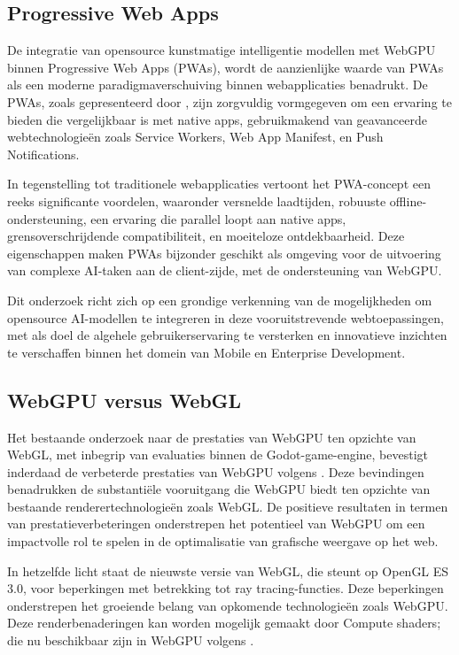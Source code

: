 \subsection{Progressive Web Apps}
De integratie van opensource kunstmatige intelligentie modellen met WebGPU binnen Progressive Web Apps (PWAs), wordt de aanzienlijke waarde van PWAs als een moderne paradigmaverschuiving binnen webapplicaties benadrukt. 
\bigbreak{}
De PWAs, zoals gepresenteerd door \textcite{Shumylo2023}, zijn zorgvuldig vormgegeven om een ervaring te bieden die vergelijkbaar is met native apps, gebruikmakend van geavanceerde webtechnologieën zoals Service Workers, Web App Manifest, en Push Notifications.

\bigbreak{}
In tegenstelling tot traditionele webapplicaties vertoont het PWA-concept een reeks significante voordelen, waaronder versnelde laadtijden, robuuste offline-ondersteuning, een ervaring die parallel loopt aan native apps, grensoverschrijdende compatibiliteit, en moeiteloze ontdekbaarheid. Deze eigenschappen maken PWAs bijzonder geschikt als omgeving voor de uitvoering van complexe AI-taken aan de client-zijde, met de ondersteuning van WebGPU.\@

\bigbreak{}
Dit onderzoek richt zich op een grondige verkenning van de mogelijkheden om opensource AI-modellen te integreren in deze voor\-uit\-stre\-ven\-de webtoepassingen, 
met als doel de algehele gebruikerservaring te versterken en innovatieve inzichten te verschaffen binnen het domein van Mobile en Enterprise Development.

\subsection{WebGPU versus WebGL}

Het bestaande onderzoek naar de prestaties van WebGPU ten opzichte van WebGL, met inbegrip van evaluaties binnen de Godot-game-engine, bevestigt inderdaad de verbeterde prestaties van WebGPU volgens \textcite{Fransson2023}. Deze bevindingen benadrukken de substantiële vooruitgang die WebGPU biedt ten opzichte van bestaande renderertechnologieën zoals WebGL. De positieve resultaten in termen van prestatieverbeteringen onderstrepen het potentieel van WebGPU om een impactvolle rol te spelen in de optimalisatie van grafische weergave op het web.

\bigbreak{}
In hetzelfde licht staat de nieuwste versie van WebGL, die steunt op OpenGL ES 3.0, voor beperkingen met betrekking tot ray tracing-functies. Deze beperkingen onderstrepen het groeiende belang van opkomende technologieën zoals Web\-GPU. Deze renderbenaderingen kan worden mogelijk gemaakt door Compute shaders; die nu beschikbaar zijn in WebGPU volgens \textcite{Beaufort2023}.

